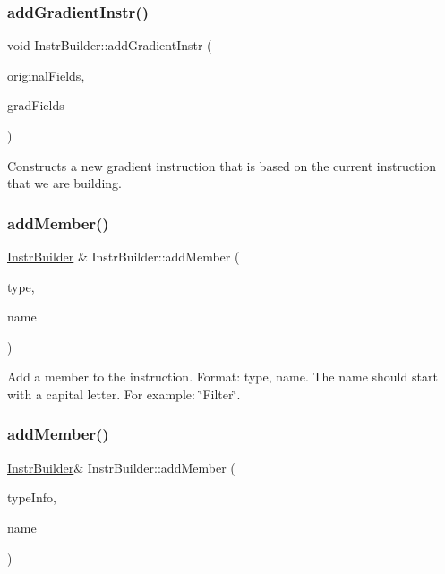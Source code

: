 \subsubsection{\texorpdfstring{add\+Gradient\+Instr()}{addGradientInstr()}}
{\footnotesize\ttfamily void Instr\+Builder\+::add\+Gradient\+Instr (\begin{DoxyParamCaption}\item[{llvm\+::\+Array\+Ref$<$ llvm\+::\+String\+Ref $>$}]{original\+Fields,  }\item[{llvm\+::\+Array\+Ref$<$ llvm\+::\+String\+Ref $>$}]{grad\+Fields }\end{DoxyParamCaption})}

Constructs a new gradient instruction that is based on the current instruction that we are building. \mbox{\label{class_instr_builder_a528dc2223a85cc13f3daae226dcee417}} 
\subsubsection{\texorpdfstring{add\+Member()}{addMember()}\hspace{0.1cm}{\footnotesize\ttfamily [1/2]}}
{\footnotesize\ttfamily \hyperlink{class_instr_builder}{Instr\+Builder} \& Instr\+Builder\+::add\+Member (\begin{DoxyParamCaption}\item[{const Member\+Type}]{type,  }\item[{const std\+::string \&}]{name }\end{DoxyParamCaption})}

Add a member to the instruction. Format\+: type, name. The name should start with a capital letter. For example\+: \char`\"{}\+Filter\char`\"{}. \mbox{\label{class_instr_builder_ac19c62ade7850afe2beff82188cb32f5}} 
\subsubsection{\texorpdfstring{add\+Member()}{addMember()}\hspace{0.1cm}{\footnotesize\ttfamily [2/2]}}
{\footnotesize\ttfamily \hyperlink{class_instr_builder}{Instr\+Builder}\& Instr\+Builder\+::add\+Member (\begin{DoxyParamCaption}\item[{\hyperlink{struct_member_type_info}{Member\+Type\+Info}}]{type\+Info,  }\item[{const std\+::string \&}]{name }\end{DoxyParamCaption})\hspace{0.3cm}{\ttfamily [inline]}}

